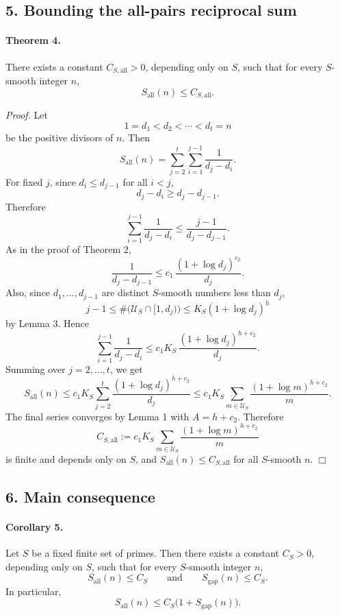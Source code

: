 \subsection*{5. Bounding the all-pairs reciprocal sum}

\paragraph{Theorem 4.}
There exists a constant \(C_{S,\mathrm{all}}>0\), depending only on \(S\), such that for every \(S\)-smooth integer \(n\),
\[
S_{\mathrm{all}}(n)\le C_{S,\mathrm{all}}.
\]

\emph{Proof.}
Let
\[
1=d_1<d_2<\cdots<d_t=n
\]
be the positive divisors of \(n\). Then
\[
S_{\mathrm{all}}(n)=\sum_{j=2}^{t}\sum_{i=1}^{j-1}\frac{1}{d_j-d_i}.
\]
For fixed \(j\), since \(d_i\le d_{j-1}\) for all \(i<j\),
\[
d_j-d_i\ge d_j-d_{j-1}.
\]
Therefore
\[
\sum_{i=1}^{j-1}\frac{1}{d_j-d_i}\le \frac{j-1}{d_j-d_{j-1}}.
\]
As in the proof of Theorem 2,
\[
\frac{1}{d_j-d_{j-1}} \le c_1\,\frac{(1+\log d_j)^{c_2}}{d_j}.
\]
Also, since \(d_1,\dots,d_{j-1}\) are distinct \(S\)-smooth numbers less than \(d_j\),
\[
j-1\le \#\bigl(\mathcal U_S\cap [1,d_j)\bigr)\le K_S(1+\log d_j)^h
\]
by Lemma 3. Hence
\[
\sum_{i=1}^{j-1}\frac{1}{d_j-d_i}
\le c_1K_S\,\frac{(1+\log d_j)^{h+c_2}}{d_j}.
\]
Summing over \(j=2,\dots,t\), we get
\[
S_{\mathrm{all}}(n)
\le
c_1K_S\sum_{j=2}^{t}\frac{(1+\log d_j)^{h+c_2}}{d_j}
\le
c_1K_S\sum_{m\in \mathcal U_S}\frac{(1+\log m)^{h+c_2}}{m}.
\]
The final series converges by Lemma 1 with \(A=h+c_2\). Therefore
\[
C_{S,\mathrm{all}}
:=
c_1K_S\sum_{m\in \mathcal U_S}\frac{(1+\log m)^{h+c_2}}{m}
\]
is finite and depends only on \(S\), and \(S_{\mathrm{all}}(n)\le C_{S,\mathrm{all}}\) for all \(S\)-smooth \(n\).
\hfill\(\Box\)

\subsection*{6. Main consequence}

\paragraph{Corollary 5.}
Let \(S\) be a fixed finite set of primes. Then there exists a constant \(C_S>0\), depending only on \(S\), such that for every \(S\)-smooth integer \(n\),
\[
S_{\mathrm{all}}(n)\le C_S
\qquad\text{and}\qquad
S_{\mathrm{gap}}(n)\le C_S.
\]
In particular,
\[
S_{\mathrm{all}}(n)\le C_S\bigl(1+S_{\mathrm{gap}}(n)\bigr).
\]

